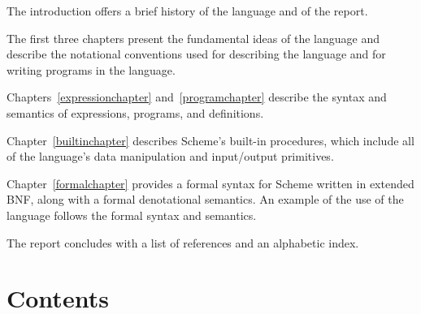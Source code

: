 \vest The introduction offers a brief history of the language and of
the report.

\vest The first three chapters present the fundamental ideas of the
language and describe the notational conventions used for describing the
language and for writing programs in the language.

\vest Chapters~\ref{expressionchapter} and~\ref{programchapter} describe
the syntax and semantics of expressions, programs, and definitions.

\vest Chapter~\ref{builtinchapter} describes Scheme's built-in
procedures, which include all of the language's data manipulation and
input/output primitives.

\vest Chapter~\ref{formalchapter} provides a formal syntax for Scheme
written in extended BNF, along with a formal denotational semantics.
An example of the use of the language follows the formal syntax and
semantics.

\vest The report concludes with a list of references and an
alphabetic index.



\vfill
\eject

\chapter*{Contents}
\addvspace{3.5pt}                  %
\renewcommand{\tocshrink}{-3.5pt}  %
{\footnotesize
\tableofcontents
}

\vfill
\eject

